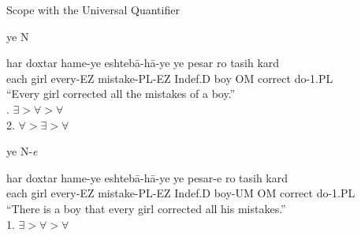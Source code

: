 \documentclass[10pt]{beamer}
\begin{document}
\begin {frame} {Scope with the Universal Quantifier}

\begin {exampleblock} {ye N}
{\footnotesize
	\begin {exe}
		\ex \label{} \gll	har doxtar hame-ye eshteb\={a}-h\={a}-ye ye pesar ro tasih kard\\
					each girl	every-{\scriptsize EZ} mistake-{\scriptsize PL}-{\scriptsize EZ} {\scriptsize Indef.D} boy {\scriptsize OM} correct do-{\scriptsize 1.PL}\\
			``Every girl corrected all the mistakes of a boy.'' \\ . $ \exists > \forall > \forall$ \\ 2. $\forall > \exists > \forall$\\
	\end {exe}}
\end {exampleblock}
\pause
\begin {exampleblock} {ye N-\emph{{\color {red}e}}}
{\footnotesize
	\begin {exe}
		\ex \label{} \gll	har doxtar hame-ye eshteb\={a}-h\={a}-ye ye pesar-{\color {red}e} ro tasih kard\\
					each girl	every-{\scriptsize EZ} mistake-{\scriptsize PL}-{\scriptsize EZ} {\scriptsize Indef.D} boy-{\scriptsize UM} {\scriptsize OM} correct do-{\scriptsize 1.PL}\\
			``There is a boy that every girl corrected all his mistakes.'' \\ 1. $ \exists > \forall > \forall$\\
	\end {exe}}
\end {exampleblock}

\end {frame}

\end{document}
